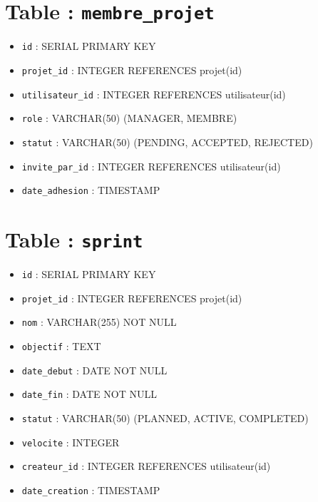 \documentclass[12pt,a4paper]{report}
\begin{document}
\section*{Table : \texttt{membre\_projet}}
\begin{itemize}
\item \verb|id| : SERIAL PRIMARY KEY
\item \verb|projet_id| : INTEGER REFERENCES projet(id)
\item \verb|utilisateur_id| : INTEGER REFERENCES utilisateur(id)
\item \verb|role| : VARCHAR(50) (MANAGER, MEMBRE)
\item \verb|statut| : VARCHAR(50) (PENDING, ACCEPTED, REJECTED)
\item \verb|invite_par_id| : INTEGER REFERENCES utilisateur(id)
\item \verb|date_adhesion| : TIMESTAMP
\end{itemize}

\section*{Table : \texttt{sprint}}
\begin{itemize}
\item \verb|id| : SERIAL PRIMARY KEY
\item \verb|projet_id| : INTEGER REFERENCES projet(id)
\item \verb|nom| : VARCHAR(255) NOT NULL
\item \verb|objectif| : TEXT
\item \verb|date_debut| : DATE NOT NULL
\item \verb|date_fin| : DATE NOT NULL
\item \verb|statut| : VARCHAR(50) (PLANNED, ACTIVE, COMPLETED)
\item \verb|velocite| : INTEGER
\item \verb|createur_id| : INTEGER REFERENCES utilisateur(id)
\item \verb|date_creation| : TIMESTAMP
\end{itemize}
\end{document}
